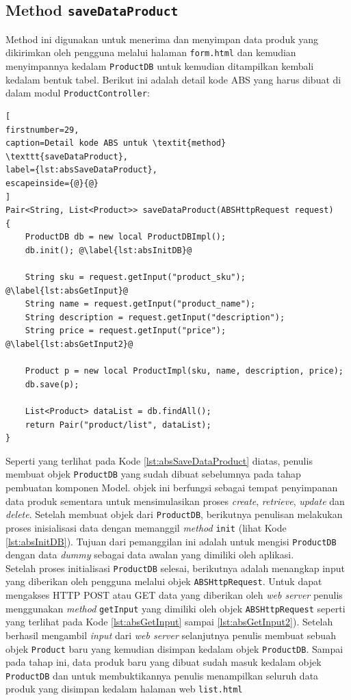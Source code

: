 \subsection{Method \texttt{saveDataProduct}}
Method ini digunakan untuk menerima dan menyimpan data produk yang dikirimkan oleh pengguna melalui halaman \texttt{form.html} dan kemudian menyimpannya kedalam \texttt{ProductDB} untuk kemudian ditampilkan kembali kedalam bentuk tabel. Berikut ini adalah detail kode ABS yang harus dibuat di dalam modul \texttt{ProductController}:

\begin{lstlisting}[
firstnumber=29,
caption=Detail kode ABS untuk \textit{method} \texttt{saveDataProduct},
label={lst:absSaveDataProduct},
escapeinside={@}{@}
]
Pair<String, List<Product>> saveDataProduct(ABSHttpRequest request)
{
	ProductDB db = new local ProductDBImpl();
	db.init(); @\label{lst:absInitDB}@
	
	String sku = request.getInput("product_sku"); @\label{lst:absGetInput}@
	String name = request.getInput("product_name");
	String description = request.getInput("description");
	String price = request.getInput("price"); @\label{lst:absGetInput2}@
	
	Product p = new local ProductImpl(sku, name, description, price);
	db.save(p);
	
	List<Product> dataList = db.findAll();
	return Pair("product/list", dataList);
}
\end{lstlisting}

Seperti yang terlihat pada Kode \ref{lst:absSaveDataProduct} diatas, penulis membuat objek \texttt{ProductDB} yang sudah dibuat sebelumnya pada tahap pembuatan komponen Model. objek ini berfungsi sebagai tempat penyimpanan data produk sementara untuk mensimulasikan proses \textit{create}, \textit{retrieve}, \textit{update} dan \textit{delete}. Setelah membuat objek dari \texttt{ProductDB}, berikutnya penulisan melakukan proses inisialisasi data dengan memanggil \textit{method} \texttt{init} (lihat Kode \ref{lst:absInitDB}). Tujuan dari pemanggilan ini adalah untuk mengisi \texttt{ProductDB} dengan data \textit{dummy} sebagai data awalan yang dimiliki oleh aplikasi.\\

Setelah proses initialisasi \texttt{ProductDB} selesai, berikutnya adalah menangkap input yang diberikan oleh pengguna melalui objek \texttt{ABSHttpRequest}. Untuk dapat mengakses HTTP POST atau GET data yang diberikan oleh \textit{web server} penulis menggunakan \textit{method} \texttt{getInput} yang dimiliki oleh objek \texttt{ABSHttpRequest} seperti yang terlihat pada Kode \ref{lst:absGetInput} sampai \ref{lst:absGetInput2}). Setelah berhasil mengambil \textit{input} dari \textit{web server} selanjutnya penulis membuat sebuah objek \texttt{Product} baru yang kemudian disimpan kedalam objek \texttt{ProductDB}. Sampai pada tahap ini, data produk baru yang dibuat sudah masuk kedalam objek \texttt{ProductDB} dan untuk membuktikannya penulis menampilkan seluruh data produk yang disimpan kedalam halaman web \texttt{list.html}

